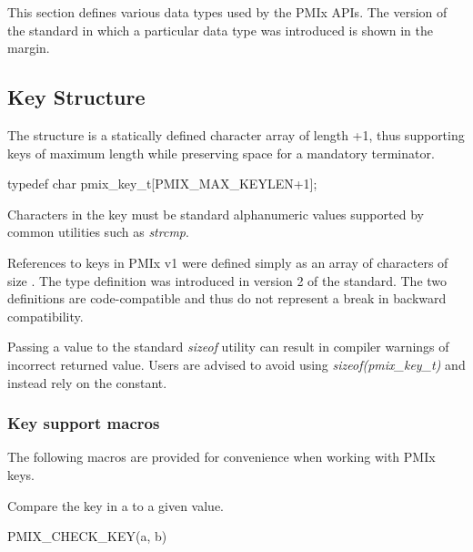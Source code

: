 This section defines various data types used by the \ac{PMIx} APIs. The version of the standard in which a particular data type was introduced is shown in the margin.

\subsection{Key Structure}

The  structure is a statically defined character array of length +1, thus supporting keys of maximum length  while preserving space for a mandatory  terminator.

\cspecificstart
\begin{codepar}
typedef char pmix_key_t[PMIX_MAX_KEYLEN+1];
\end{codepar}
\cspecificend

Characters in the key must be standard alphanumeric values supported by common utilities such as \textit{strcmp}.

\adviceuserstart
References to keys in \ac{PMIx} v1 were defined simply as an array of characters of size . The  type definition was introduced in version 2 of the standard. The two definitions are code-compatible and thus do not represent a break in backward compatibility.

Passing a  value to the standard \textit{sizeof} utility can result in compiler warnings of incorrect returned value. Users are advised to avoid using \textit{sizeof(pmix_key_t)} and instead rely on the  constant.
\adviceuserend

\subsubsection{Key support macros}

The following macros are provided for convenience when working with \ac{PMIx} keys.


Compare the key in a  to a given value.

\cspecificstart
\begin{codepar}
PMIX_CHECK_KEY(a, b)
\end{codepar}
\cspecificend

